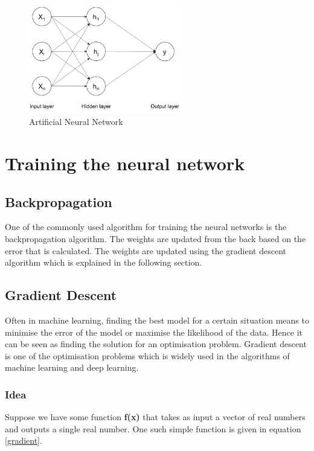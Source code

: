 \documentclass[a4paper, 12pt, oneside, BCOR1cm,toc=chapterentrywithdots]{scrbook}
\begin{document}
\begin{figure}[h]
\centering
\includegraphics[width=0.6\textwidth]{image7.png}
\caption{Artificial Neural Network}
\label{fig:pic7}
\end{figure}


\section{Training the neural network}

\subsection{Backpropagation}

One of the commonly used algorithm for training the neural networks is the backpropagation algorithm. The weights are updated from the back based on the error that is calculated. The weights are updated using the gradient descent algorithm which is explained in the following section.

\subsection{Gradient Descent}

Often in machine learning, finding the best model for a certain situation means to minimise the error of the model or maximise the likelihood of the data. Hence it can be seen as finding the solution for an optimisation problem. Gradient descent is one of the optimisation problems which is widely used in the algorithms of machine learning and deep learning. 

\subsubsection{Idea}

Suppose we have some function \textbf{f(x)} that takes as input a vector of real numbers and outputs a single real number. One such simple function is given in equation \ref{gradient}. 
\end{document}
